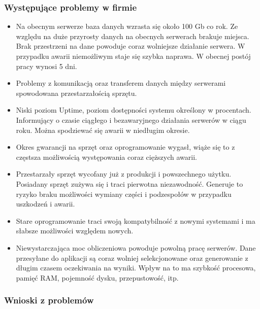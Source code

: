 \documentclass[a4paper, 12pt]{article}
\begin{document}
\subsubsection{Występujące problemy w firmie} 
		\begin{itemize}
		        \item Na obecnym serwerze baza danych wzrasta się około 100 Gb co rok. Ze względu na duże przyrosty danych na obecnych serwerach brakuje miejsca. Brak przestrzeni na dane powoduje coraz wolniejsze działanie serwera. W przypadku awarii niemożliwym staje się szybka naprawa. W obecnej postój pracy wynosi 5 dni.
	        	\item Problemy z komunikacją oraz transferem danych między serwerami spowodowana przestarzałością sprzętu.
	        	\item Niski poziom Uptime, poziom dostępności systemu określony w procentach. Informujący o czasie ciągłego i bezawaryjnego działania serwerów w ciągu roku. Można spodziewać się awarii w niedługim okresie.
	        	\item Okres gwarancji na sprzęt oraz oprogramowanie wygasł, wiąże się to z częstsza możliwością występowania coraz cięższych awarii.
	        	\item Przestarzały sprzęt wycofany już z produkcji i powszechnego użytku. Posiadany sprzęt zużywa się i traci pierwotna niezawodność. Generuje to ryzyko braku możliwości wymiany części i podzespołów w przypadku uszkodzeń i awarii.
	        	\item  Stare oprogramowanie traci swoją kompatybilność z nowymi systemami i ma słabsze możliwości względem nowych.
	        	\item Niewystarczająca moc obliczeniowa powoduje powolną pracę serwerów. Dane przesyłane do aplikacji są coraz wolniej selekcjonowane oraz generowanie z długim czasem oczekiwania na wyniki. Wpływ na to ma szybkość procesowa, pamięć RAM, pojemność dysku, przepustowość, itp.
		    \end{itemize}
	  \subsubsection{Wnioski z problemów} 
	
\end{document}
